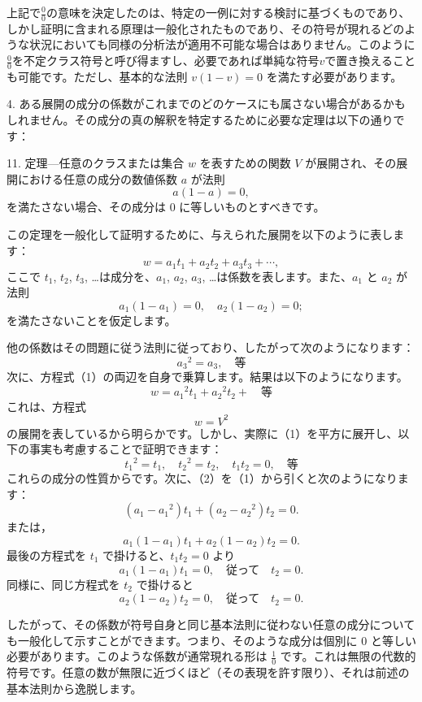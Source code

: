 \documentclass[a4paper,11pt,openany]{ltjsbook}
\begin{document}
上記で$\frac{0}{0}$の意味を決定したのは、特定の一例に対する検討に基づくものであり、しかし証明に含まれる原理は一般化されたものであり、その符号が現れるどのような状況においても同様の分析法が適用不可能な場合はありません。このように$\frac{0}{0}$を不定クラス符号と呼び得ますし、必要であれば単純な符号$v$で置き換えることも可能です。ただし、基本的な法則 $v(1 - v) = 0$ を満たす必要があります。

4. ある展開の成分の係数がこれまでのどのケースにも属さない場合があるかもしれません。その成分の真の解釈を特定するために必要な定理は以下の通りです：

11. 定理---任意のクラスまたは集合 $w$ を表すための関数 $V$ が展開され、その展開における任意の成分の数値係数 $a$ が法則
\[
a(1 - a) = 0,
\]
を満たさない場合、その成分は 0 に等しいものとすべきです。

この定理を一般化して証明するために、与えられた展開を以下のように表します：
\setcounter{equation}{0}
\begin{equation}
w = a_1 t_1 + a_2 t_2 + a_3 t_3 + \cdots,
\end{equation}
ここで $t_1$, $t_2$, $t_3$, \ldots は成分を、$a_1$, $a_2$, $a_3$, \ldots は係数を表します。また、$a_1$ と $a_2$ が法則
\[
a_1(1 - a_1) = 0, \quad a_2(1 - a_2) = 0;
\]
を満たさないことを仮定します。

他の係数はその問題に従う法則に従っており、したがって次のようになります：
\[
{a_3}^2 = a_3, \quad 等
\]
次に、方程式（1）の両辺を自身で乗算します。結果は以下のようになります。
\begin{equation}
w = {a_1}^2 t_1 + {a_2}^2 t_2 + \quad 等
\end{equation}
これは、方程式
\[
w = V^2
\]
の展開を表しているから明らかです。しかし、実際に（1）を平方に展开し、以下の事実も考慮することで証明できます：
\[
{t_1}^2 = t_1, \quad {t_2}^2 = t_2, \quad t_1 t_2 = 0, \quad 等
\]
これらの成分の性質からです。次に、（2）を（1）から引くと次のようになります：
\[
\left(a_1 - {a_1}^2\right) t_1 + \left(a_2 - {a_2}^2\right) t_2 = 0.
\]
または，
\[
a_1 \left(1 - a_1\right) t_1 + a_2 \left(1 - a_2\right) t_2 = 0.
\]
最後の方程式を $t_1$ で掛けると、$t_1 t_2 = 0$ より
\[
a_1 \left(1 - a_1\right) t_1 = 0, \quad \textrm{従って} \quad t_2 = 0.
\]
同様に、同じ方程式を $t_2$ で掛けると
\[
a_2 \left(1 - a_2\right) t_2 = 0, \quad \textrm{従って} \quad t_2 = 0.
\]

したがって、その係数が符号自身と同じ基本法則に従わない任意の成分についても一般化して示すことができます。つまり、そのような成分は個別に $0$ と等しい必要があります。このような係数が通常現れる形は $\frac{1}{0}$ です。これは無限の代数的符号です。任意の数が無限に近づくほど（その表現を許す限り）、それは前述の基本法則から逸脱します。
\end{document}

